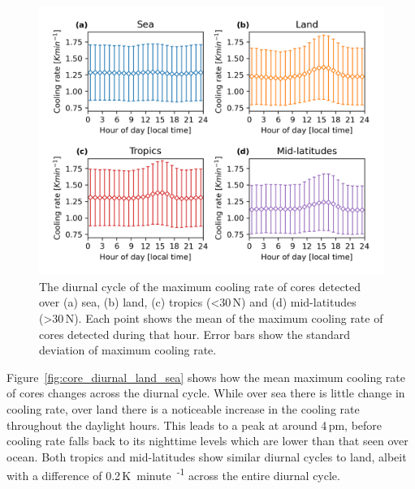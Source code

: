 \begin{figure}[tp]
    \centering
    \includegraphics[width=\textwidth]{figures/chapter2_15.png}
    \caption[
    The diurnal cycle of the maximum cooling rate of cores detected over land, sea, tropics and mid-latitudes
    ]{
    The diurnal cycle of the maximum cooling rate of cores detected over (a) sea, (b) land, (c) tropics (\textless 30\,\textdegree N) and (d) mid-latitudes (\textgreater 30\,\textdegree N). Each point shows the mean of the maximum cooling rate of cores detected during that hour. Error bars show the standard deviation of maximum cooling rate.
    }
    \label{fig:core_diurnal_cooling_rate}
\end{figure}

Figure~\ref{fig:core_diurnal_land_sea} shows how the mean maximum cooling rate of cores changes across the diurnal cycle.
While over sea there is little change in cooling rate, over land there is a noticeable increase in the cooling rate throughout the daylight hours.
This leads to a peak at around 4\,pm, before cooling rate falls back to its nighttime levels which are lower than that seen over ocean.
Both tropics and mid-latitudes show similar diurnal cycles to land, albeit with a difference of 0.2\,\unit{K minute\textsuperscript{-1}} across the entire diurnal cycle.





